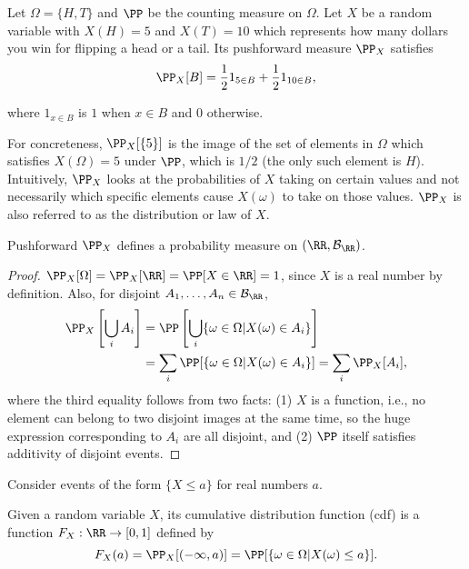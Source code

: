 \begin{example}
\exlabel

Let $\Omega = \{H, T\}$ and $\PP$ be the counting measure on $\Omega$. Let $X$ be a random variable with $X(H) = 5$ and $X(T) = 10$ which represents how many dollars you win for flipping a head or a tail. Its pushforward measure $\PP_X$ satisfies 
\[\PP_X[B] = \frac{1}{2} 1_{5\in B} + \frac{1}{2} 1_{10\in B},\]

where $1_{x\in B}$ is $1$ when $x\in B$ and $0$ otherwise. 
\end{example}

For concreteness, $\PP_X[\{5\}]$ is the image of the set of elements in $\Omega$ which satisfies $X(\Omega) = 5$ under $\PP$, which is $1/2$ (the only such element is $H$). Intuitively, $\PP_X$ looks at the probabilities of $X$ taking on certain values and not necessarily which specific elements cause $X(\omega)$ to take on those values. $\PP_X$ is also referred to as the \ac{distribution} or \ac{law} of $X$. 

\begin{theorem}
\thmlabel

Pushforward $\PP_X$ defines a probability measure on $(\RR, \mathcal{B}_{\RR})$. 
\end{theorem}

\begin{proof}
$\PP_X[\Omega] = \PP_X[\RR] = \PP[X\in \RR] = 1$, since $X$ is a real number by definition. Also, for disjoint $A_1, \hdots, A_n\in \mathcal{B}_{\RR}$,
\begin{align*}
    \PP_X\left[\bigcup_{i} A_i\right] &= \PP\left[\bigcup_{i}\{\omega\in \Omega \vert X(\omega)\in A_i\}\right] \\
    &= \sum_i \PP[\{\omega \in \Omega\vert X(\omega)\in A_i\}] = \sum_i \PP_X[A_i],
\end{align*}
where the third equality follows from two facts: (1) $X$ is a function, i.e., no element can belong to two disjoint images at the same time, so the huge expression corresponding to $A_i$ are all disjoint, and (2) $\PP$ itself satisfies additivity of disjoint events. 
\end{proof}

Consider events of the form $\{X\leq a\}$ for real numbers $a$. 

\begin{definition}

Given a random variable $X$, its \ac{cumulative distribution function} (cdf) is a function $F_X: \RR \rightarrow [0,1]$ defined by 
\[F_X(a) = \PP_X[(-\infty, a)] = \PP[\{\omega\in \Omega \vert X(\omega)\leq a\}].\]
\end{definition}

